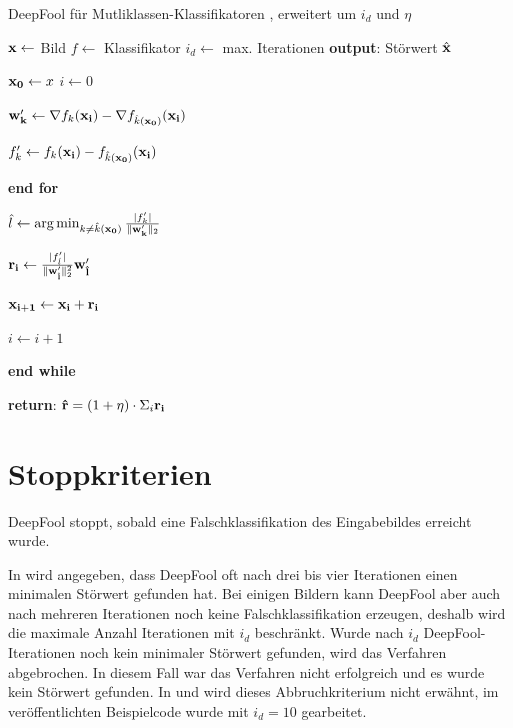 \documentclass{FFHS_Thesis_Additions/ffhsthesis}
\begin{document}
\begin{algorithm}
\caption{DeepFool für Mutliklassen-Klassifikatoren \cite{moosavi-dezfooli_deepfool_2016}, erweitert um $i_d$ und $\eta$}
\label{alg_deepfool}
\begin{algorithmic}[1]

\State $\bold{x} \gets$ Bild
\State $f \gets$ Klassifikator
\State $i_d \gets$ max. Iterationen
\State \textbf{output}: Störwert $\hat{\bold{x}}$

\State $\bold{x_0} \gets x$
\State $i \gets 0$



\State $\bold{w'_k} \gets \nabla f_k(\bold{x_i}) - \nabla f_{\hat{k}(\bold{x_0})}(\bold{x_i}) $

\State $f'_k \gets f_k(\bold{x_i}) - f_{\hat{k}(\bold{x_0})}(\bold{x_i}) $

\EndFor
\State \textbf{end for}

\State $\hat{l} \gets \arg \min_{k \neq \hat{k}(\bold{x_0})} \frac{ \vert f'_k \vert}{\Vert \bold{w'_k} \Vert_2}  $

\State $\bold{r_i} \gets {\frac{\vert f'_{\hat{l}} \vert}{\Vert \bold{w'_{\hat{l}}} \Vert^2_2}} \bold{w'_{\hat{l}}} $

\State $\bold{x_{i+1}} \gets \bold{x_i} + \bold{r_i}$

\State $i \gets i + 1$

\EndWhile
\State \textbf{end while}

\State \textbf{return}: $\bold{\hat{r}} = (1 + \eta) \cdot \Sigma_i \bold{r_i} $

\end{algorithmic}
\end{algorithm}


\section{Stoppkriterien}

DeepFool stoppt, sobald eine Falschklassifikation des Eingabebildes erreicht wurde. 

In \cite{moosavi-dezfooli_deepfool_2016} wird angegeben, dass DeepFool oft nach drei bis vier Iterationen einen minimalen Störwert gefunden hat. 
Bei einigen Bildern kann DeepFool aber auch nach mehreren Iterationen noch keine Falschklassifikation erzeugen, deshalb wird die maximale Anzahl Iterationen mit $i_d$ beschränkt. 
Wurde nach $i_d$ DeepFool-Iterationen noch kein minimaler Störwert gefunden, wird das Verfahren abgebrochen. 
In diesem Fall war das Verfahren nicht erfolgreich und es wurde kein Störwert gefunden. In \cite{moosavi-dezfooli_universal_2017-1} und \cite{moosavi-dezfooli_deepfool_2016} wird dieses Abbruchkriterium nicht erwähnt, im veröffentlichten Beispielcode wurde mit $i_d = 10$ gearbeitet.
\end{document}
